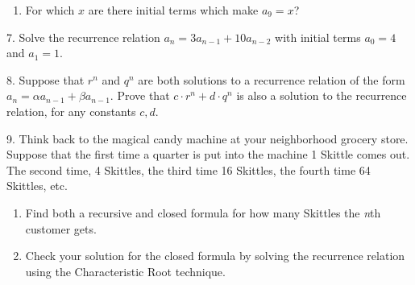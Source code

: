 \documentclass[10pt,]{book}
\theoremstyle{plain}
\theoremstyle{definition}
\numberwithin{equation}{chapter}
\begin{document}
\begin{exerciselist}
\begin{enumerate}[label=(\alph*)]
\item\hypertarget{li-578}{}
              For which \(x\) are there initial terms which make \(a_9 = x\)?
\end{enumerate}
\par\smallskip
\item[7.]\hypertarget{exercise-178}{}
          Solve the recurrence relation \(a_n = 3a_{n-1} + 10a_{n-2}\) with initial terms \(a_0 = 4\) and \(a_1 = 1\).
\par\smallskip
\item[8.]\hypertarget{exercise-179}{}
          Suppose that \(r^n\) and \(q^n\) are both solutions to a recurrence relation of the form \(a_n = \alpha a_{n-1} + \beta a_{n-1}\).  Prove that \(c\cdot r^n + d \cdot q^n\) is also a solution to the recurrence relation, for any constants \(c, d\).
\par\smallskip
\item[9.]\hypertarget{exercise-180}{}
                Think back to the magical candy machine at your neighborhood grocery store. Suppose that the first time a quarter is put into the machine 1 Skittle comes out. The second time, 4 Skittles, the third time 16 Skittles, the fourth time 64 Skittles, etc.
                \leavevmode%
\begin{enumerate}[label=(\alph*)]
\item\hypertarget{li-579}{}
                      Find both a recursive and closed formula for how many Skittles the \emph{n}th customer gets.
\item\hypertarget{li-580}{}
                      Check your solution for the closed formula by solving the recurrence relation using the Characteristic Root technique.
\end{enumerate}


\end{exerciselist}
\end{document}
